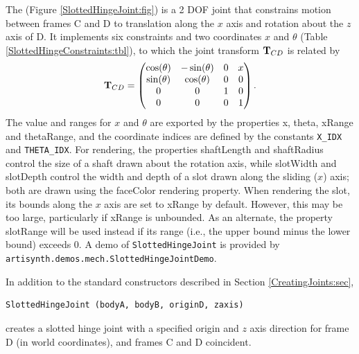The  
(Figure \ref{SlottedHingeJoint:fig}) is
a 2 DOF joint that constrains motion between frames C and D to
translation along the $x$ axis and rotation about the $z$ axis of D.
It implements six constraints and two coordinates $x$ and $\theta$
(Table \ref{SlottedHingeConstraints:tbl}), to which the joint
transform ${\bf T}_{CD}$ is related by
%
\begin{equation}
{\bf T}_{CD} = \left(\begin{matrix}
\cos(\theta) & -\sin(\theta) & 0 & x \\
\sin(\theta) &  \cos(\theta) & 0 & 0 \\
0 & 0 & 1 & 0 \\
0 & 0 & 0 & 1 
\end{matrix}\right).
\label{SlottedHingeTCD:eqn}
\end{equation}
The value and ranges for $x$ and $\theta$ are exported by the
properties {\sf x}, {\sf theta}, {\sf xRange} and {\sf thetaRange},
and the coordinate indices are defined by the constants {\tt X\_IDX}
and {\tt THETA\_IDX}. For rendering, the properties {\sf shaftLength}
and {\sf shaftRadius} control the size of a shaft drawn about the
rotation axis, while {\sf slotWidth} and {\sf slotDepth} control the
width and depth of a slot drawn along the sliding ($x$) axis; both are
drawn using the {\sf faceColor} rendering property. When rendering the
slot, its bounds along the $x$ axis are set to {\sf xRange} by
default. However, this may be too large, particularly if {\sf xRange}
is unbounded. As an alternate, the property {\sf slotRange} will be
used instead if its range (i.e., the upper bound minus the lower
bound) exceeds 0.  A demo of {\tt SlottedHingeJoint} is provided by
{\tt artisynth.demos.mech.SlottedHingeJointDemo}.

In addition to the standard constructors described in
Section \ref{CreatingJoints:sec},
\begin{lstlisting}[]
  SlottedHingeJoint (bodyA, bodyB, originD, zaxis)
\end{lstlisting}
%
creates a slotted hinge joint with a specified origin and $z$ axis direction
for frame D (in world coordinates), and frames C and D coincident.

